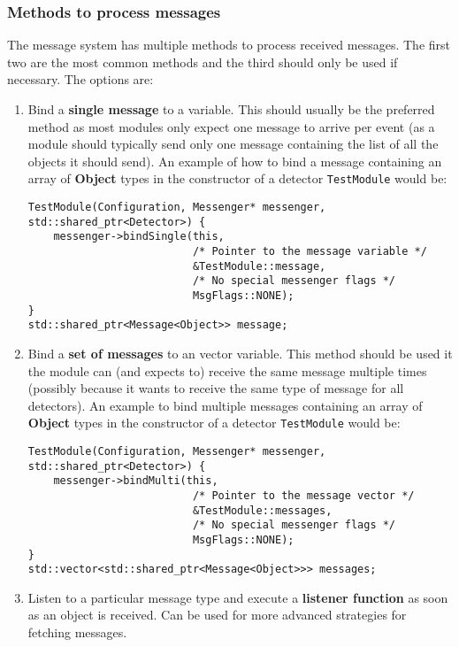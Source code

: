 \subsubsection{Methods to process messages}
The message system has multiple methods to process received messages.
The first two are the most common methods and the third should only be used if necessary.
The options are:
\begin{enumerate}
\item Bind a \textbf{single message} to a variable.
This should usually be the preferred method as most modules only expect one message to arrive per event (as a module should typically send only one message containing the list of all the objects it should send).
An example of how to bind a message containing an array of \textbf{Object} types in the constructor of a detector \texttt{TestModule} would be:
\begin{verbatim}
TestModule(Configuration, Messenger* messenger, std::shared_ptr<Detector>) {
    messenger->bindSingle(this,
                          /* Pointer to the message variable */
                          &TestModule::message,
                          /* No special messenger flags */
                          MsgFlags::NONE);
}
std::shared_ptr<Message<Object>> message;
\end{verbatim}
\item Bind a \textbf{set of messages} to an vector variable.
This method should be used it the module can (and expects to) receive the same message multiple times (possibly because it wants to receive the same type of message for all detectors).
An example to bind multiple messages containing an array of \textbf{Object} types in the constructor of a detector \texttt{TestModule} would be:
\begin{verbatim}
TestModule(Configuration, Messenger* messenger, std::shared_ptr<Detector>) {
    messenger->bindMulti(this,
                          /* Pointer to the message vector */
                          &TestModule::messages,
                          /* No special messenger flags */
                          MsgFlags::NONE);
}
std::vector<std::shared_ptr<Message<Object>>> messages;
\end{verbatim}
\item Listen to a particular message type and execute a \textbf{listener function} as soon as an object is received.
Can be used for more advanced strategies for fetching messages.

\end{enumerate}
